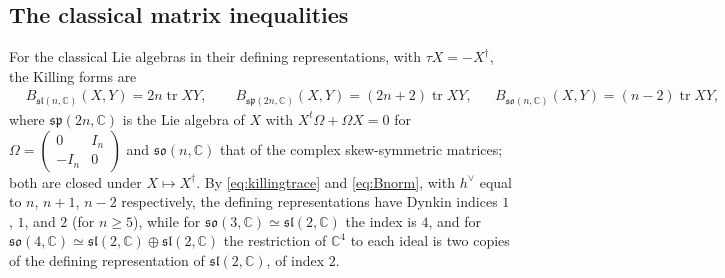 \documentclass [leqno, 10pt]{amsart}
\theoremstyle{definition}
\numberwithin{equation}{section}
\newcommand{\so}{\mathfrak{so}}
\renewcommand{\sp}{\mathfrak{sp}}
\newcommand{\sll}{\mathfrak{sl}}
\newcommand{\com}{\mathbb C}
\newcommand{\tr}{\operatorname{tr}}
\newcommand{\hv}{h^\vee}
\begin{document}
\subsection{The classical matrix inequalities}\label{sec:classical}
For the classical Lie algebras in their defining representations, with $\tau X = -X^{\dagger}$, the Killing forms are
\begin{align}\label{eq:killingtrace}
&B_{\sll(n, \com)}(X, Y) = 2n\tr XY, \qquad B_{\sp(2n, \com)}(X, Y) = (2n+2)\tr XY,&
&B_{\so(n, \com)}(X, Y) = (n-2)\tr XY,
\end{align}
where $\sp(2n, \com)$ is the Lie algebra of $X$ with $X^{t}\Omega + \Omega X = 0$ for $\Omega = \left(\begin{smallmatrix}0 & I_{n}\\ -I_{n} & 0\end{smallmatrix}\right)$ and $\so(n, \com)$ that of the complex skew-symmetric matrices; both are closed under $X \mapsto X^{\dagger}$. By \eqref{eq:killingtrace} and \eqref{eq:Bnorm}, with $\hv$ equal to $n$, $n+1$, $n-2$ respectively, the defining representations have Dynkin indices $1$, $1$, and $2$ (for $n \geq 5$), while for $\so(3, \com) \simeq \sll(2, \com)$ the index is $4$, and for $\so(4, \com) \simeq \sll(2, \com) \oplus \sll(2, \com)$ the restriction of $\com^{4}$ to each ideal is two copies of the defining representation of $\sll(2, \com)$, of index $2$.
\end{document}
